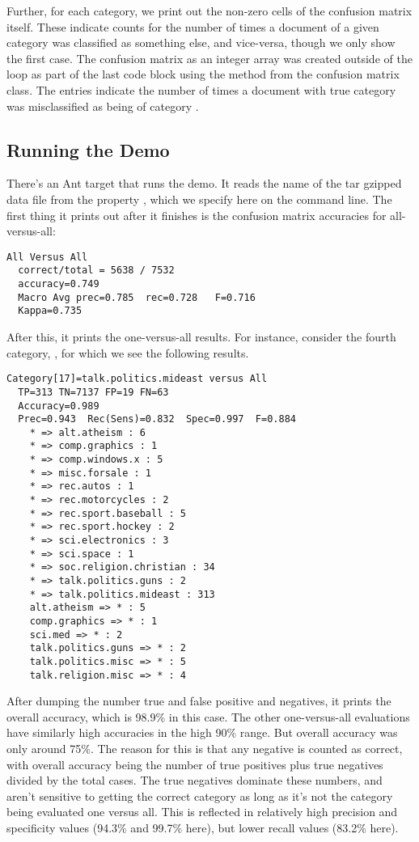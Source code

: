 Further, for each category, we print out the non-zero cells of
the confusion matrix itself.  These indicate counts for the
number of times a document of a given category was classified
as something else, and vice-versa, though we only show the first
case.
%
%
The confusion matrix as an integer array was created outside of the
loop as part of the last code block using the  method
from the confusion matrix class.  The entries 
indicate the number of times a document with true category 
was misclassified as being of category .

\subsection{Running the Demo}

There's an Ant target  that runs the demo.
It reads the name of the tar gzipped data file from
the property , which we specify here
on the command line.
%
%
The first thing it prints out after it finishes is the confusion
matrix accuracies for all-versus-all:
%
\begin{verbatim}
All Versus All
  correct/total = 5638 / 7532
  accuracy=0.749
  Macro Avg prec=0.785  rec=0.728   F=0.716
  Kappa=0.735
\end{verbatim}
%
After this, it prints the one-versus-all results.  For instance,
consider the fourth category, ,
for which we see the following results.
%
\begin{verbatim}
Category[17]=talk.politics.mideast versus All
  TP=313 TN=7137 FP=19 FN=63
  Accuracy=0.989
  Prec=0.943  Rec(Sens)=0.832  Spec=0.997  F=0.884
    * => alt.atheism : 6
    * => comp.graphics : 1
    * => comp.windows.x : 5
    * => misc.forsale : 1
    * => rec.autos : 1
    * => rec.motorcycles : 2
    * => rec.sport.baseball : 5
    * => rec.sport.hockey : 2
    * => sci.electronics : 3
    * => sci.space : 1
    * => soc.religion.christian : 34
    * => talk.politics.guns : 2
    * => talk.politics.mideast : 313
    alt.atheism => * : 5
    comp.graphics => * : 1
    sci.med => * : 2
    talk.politics.guns => * : 2
    talk.politics.misc => * : 5
    talk.religion.misc => * : 4
\end{verbatim}
%
After dumping the number true and false positive and negatives, it
prints the overall accuracy, which is 98.9\% in this case.  The other
one-versus-all evaluations have similarly high accuracies in the high
90\% range.  But overall accuracy was only around 75\%.  The reason
for this is that any negative is counted as correct, with overall
accuracy being the number of true positives plus true negatives
divided by the total cases.  The true negatives dominate these
numbers, and aren't sensitive to getting the correct category as long
as it's not the category being evaluated one versus all.  This is
reflected in relatively high precision and specificity values (94.3\%
and 99.7\% here), but lower recall values (83.2\% here).

